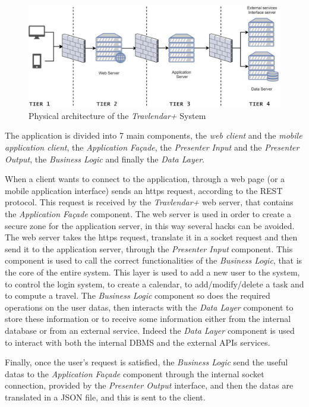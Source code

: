 \begin{figure}[H]
    \centering
    \includegraphics[scale=0.7]{Pictures/OverviewPictures/physical.jpg}
    \caption{Physical architecture of the \emph{Travlendar+} System}
\end{figure}

The application is divided into 7 main components, the \emph{web client} and the \emph{mobile application client}, the \emph{Application Façade}, the \emph{Presenter Input} and the \emph{Presenter Output}, the \emph{Business Logic} and finally the \emph{Data Layer}.

When a client wants to connect to the application, through a web page (or a mobile application interface) sends an https request, according to the REST protocol. This request is received by the \emph{Travlendar+} web server, that contains the \emph{Application Façade} component. The web server is used in order to create a secure zone for the application server, in this way several hacks can be avoided. The web server takes the https request, translate it in a socket request and then send it to the application server, through the \emph{Presenter Input} component. This component is used to call the correct functionalities of the \emph{Business Logic}, that is the core of the entire system. This layer is used to add a new user to the system, to control the login system, to create a calendar, to add/modify/delete a task and to compute a travel. The \emph{Business Logic} component so does the required operations on the user datas, then interacts with the \emph{Data Layer} component to store these information or to receive some information either from the internal database or from an external service. Indeed the \emph{Data Layer} component is used to interact with both the internal DBMS and the external APIs services.

Finally, once the user's request is satisfied, the \emph{Business Logic} send the useful datas to the \emph{Application Façade} component through the internal socket connection, provided by the \emph{Presenter Output} interface, and then the datas are translated in a JSON file, and this is sent to the client.